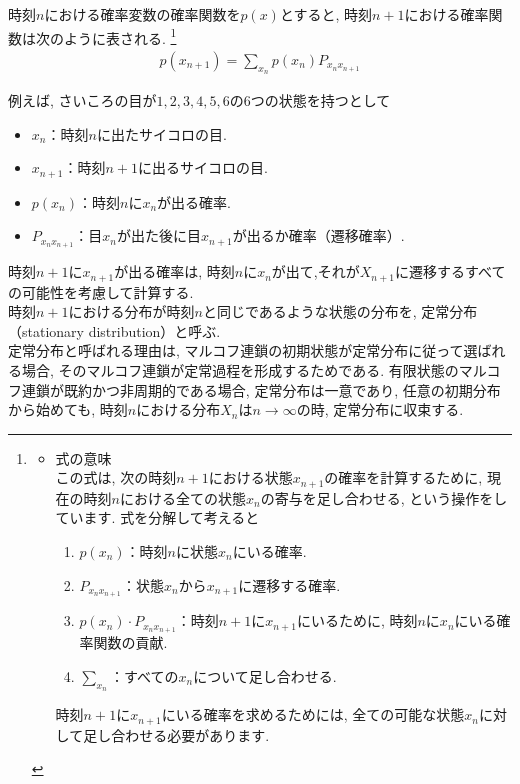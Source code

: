 \documentclass[a4j]{jsarticle}
\begin{document}
時刻$n$における確率変数の確率関数を$p(x)$とすると, 時刻$n+1$における確率関数は次のように表される.
\footnote{
	\begin{itemize}
		\item 式の意味\\
		      この式は, 次の時刻$n+1$における状態$x_{n+1}$の確率を計算するために, 現在の時刻$n$における全ての状態$x_n$の寄与を足し合わせる, という操作をしています. 式を分解して考えると
		      \begin{enumerate}
			      \item $p(x_n)$：時刻$n$に状態$x_n$にいる確率.
			      \item $P_{x_nx_{n+1}}$：状態$x_n$から$x_{n+1}$に遷移する確率.
			      \item $p(x_n) \cdot P_{x_nx_{n+1}}$：時刻$n+1$に$x_{n+1}$にいるために, 時刻$n$に$x_n$にいる確率関数の貢献.
			      \item $\sum_{x_n}$：すべての$x_n$について足し合わせる.
		      \end{enumerate}
		      時刻$n+1$に$x_{n+1}$にいる確率を求めるためには, 全ての可能な状態$x_n$に対して足し合わせる必要があります.
	\end{itemize}
}
\begin{align}
	p(x_{n+1}) = \sum_{x_n} p(x_n)P_{x_nx_{n+1}}
\end{align}

 例えば, さいころの目が$1, 2, 3, 4, 5, 6$の6つの状態を持つとして
\begin{itemize}
	\item $x_n$：時刻$n$に出たサイコロの目.
	\item $x_{n+1}$：時刻$n+1$に出るサイコロの目.
	\item $p(x_n)$：時刻$n$に$x_n$が出る確率.
	\item $P_{x_nx_{n+1}}$：目$x_n$が出た後に目$x_{n+1}$が出るか確率（遷移確率）.
\end{itemize}
時刻$n+1$に$x_{n+1}$が出る確率は, 時刻$n$に$x_n$が出て,それが$X_{n+1}$に遷移するすべての可能性を考慮して計算する.\\

 時刻$n+1$における分布が時刻$n$と同じであるような状態の分布を, 定常分布（stationary distribution）と呼ぶ.\\

定常分布と呼ばれる理由は, マルコフ連鎖の初期状態が定常分布に従って選ばれる場合, そのマルコフ連鎖が定常過程を形成するためである. 有限状態のマルコフ連鎖が既約かつ非周期的である場合, 定常分布は一意であり, 任意の初期分布から始めても, 時刻$n$における分布$X_n$は$n \rightarrow \infty$の時, 定常分布に収束する.\\
\end{document}
